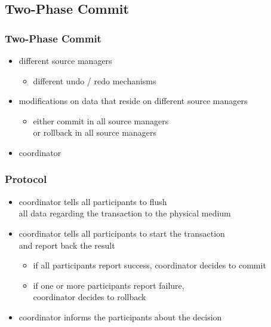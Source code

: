 \documentclass[dvipsnames]{beamer}
\theoremstyle{plain}
\begin{document}
\subsection{Two-Phase Commit}

\begin{frame}
  \frametitle{Two-Phase Commit}

  \begin{itemize}
    \item different source managers
    \begin{itemize}
      \item different undo / redo mechanisms
    \end{itemize}

    \pause
    \item modifications on data that reside on different source managers
    \begin{itemize}
      \item either commit in all source managers\\
        or rollback in all source managers
    \end{itemize}

    \pause
    \item \alert{coordinator}
  \end{itemize}
\end{frame}

\begin{frame}
  \frametitle{Protocol}

  \begin{itemize}
    \item coordinator tells all participants to flush\\
      all data regarding the transaction to the physical medium

    \pause
    \item coordinator tells all participants to start the transaction\\
      and report back the result
    \begin{itemize}
      \item if all participants report success, coordinator decides to
        commit
      \item if one or more participants report failure,\\
        coordinator decides to rollback
    \end{itemize}

    \pause
    \item coordinator informs the participants about the decision
  \end{itemize}
\end{frame}
\end{document}
